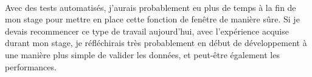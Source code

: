 \documentclass{article}
\begin{document}
    \paragraph{}
    Avec des tests automatisés, j'aurais probablement eu plus de temps à la fin de mon stage pour mettre en place cette fonction de fenêtre de manière sûre. Si je devais recommencer ce type de travail aujourd'hui, avec l'expérience acquise durant mon stage, je réfléchirais très probablement en début de développement à une manière plus simple de valider les données, et peut-être également les performances.

    


\end{document}
